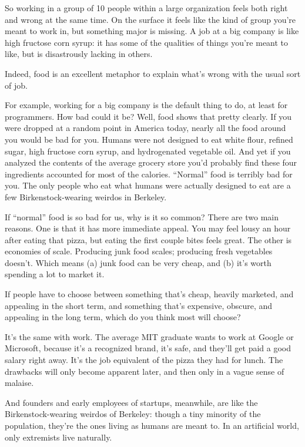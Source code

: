 So working in a group of 10 people within a large organization feels
both right and wrong at the same time. On the surface it feels like the
kind of group you're meant to work in, but something major is missing. A
job at a big company is like high fructose corn syrup: it has some of
the qualities of things you're meant to like, but is disastrously
lacking in others.

Indeed, food is an excellent metaphor to explain what's wrong with the
usual sort of job.

For example, working for a big company is the default thing to do, at
least for programmers. How bad could it be? Well, food shows that pretty
clearly. If you were dropped at a random point in America today, nearly
all the food around you would be bad for you. Humans were not designed
to eat white flour, refined sugar, high fructose corn syrup, and
hydrogenated vegetable oil. And yet if you analyzed the contents of the
average grocery store you'd probably find these four ingredients
accounted for most of the calories. ``Normal'' food is terribly bad for
you. The only people who eat what humans were actually designed to eat
are a few Birkenstock-wearing weirdos in Berkeley.

If ``normal'' food is so bad for us, why is it so common? There are two
main reasons. One is that it has more immediate appeal. You may feel
lousy an hour after eating that pizza, but eating the first couple bites
feels great. The other is economies of scale. Producing junk food
scales; producing fresh vegetables doesn't. Which means (a) junk food
can be very cheap, and (b) it's worth spending a lot to market it.

If people have to choose between something that's cheap, heavily
marketed, and appealing in the short term, and something that's
expensive, obscure, and appealing in the long term, which do you think
most will choose?

It's the same with work. The average MIT graduate wants to work at
Google or Microsoft, because it's a recognized brand, it's safe, and
they'll get paid a good salary right away. It's the job equivalent of
the pizza they had for lunch. The drawbacks will only become apparent
later, and then only in a vague sense of malaise.

And founders and early employees of startups, meanwhile, are like the
Birkenstock-wearing weirdos of Berkeley: though a tiny minority of the
population, they're the ones living as humans are meant to. In an
artificial world, only extremists live naturally.

